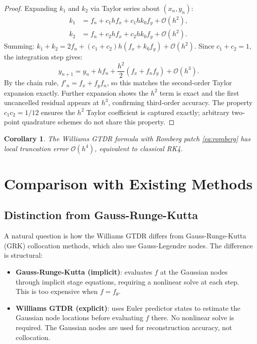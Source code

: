 \documentclass[conference]{IEEEtran}
\newtheorem{corollary}{Corollary}
\begin{document}
\begin{proof}
Expanding $k_1$ and $k_2$ via Taylor series about $(x_n, y_n)$:
\begin{align}
    k_1 &= f_n + c_1 h f_x + c_1 h k_0 f_y + \mathcal{O}(h^2), \\
    k_2 &= f_n + c_2 h f_x + c_2 h k_0 f_y + \mathcal{O}(h^2).
\end{align}
Summing: $k_1 + k_2 = 2f_n + (c_1 + c_2)h(f_x + k_0 f_y) +
\mathcal{O}(h^2)$. Since $c_1 + c_2 = 1$, the integration step gives:
\begin{equation}
    y_{n+1} = y_n + h f_n + \frac{h^2}{2}(f_x + f_n f_y) + \mathcal{O}(h^3).
\end{equation}
By the chain rule, $f'_n = f_x + f_y f_n$, so this matches the
second-order Taylor expansion exactly. Further expansion shows the $h^2$
term is exact and the first uncancelled residual appears at $h^3$,
confirming third-order accuracy. The property $c_1 c_2 = 1/12$ ensures
the $h^2$ Taylor coefficient is captured exactly; arbitrary two-point
quadrature schemes do not share this property.
\end{proof}

\begin{corollary}
The Williams GTDR formula with Romberg patch \eqref{eq:romberg} has
local truncation error $\mathcal{O}(h^4)$, equivalent to classical RK4.
\end{corollary}

\section{Comparison with Existing Methods}
\label{sec:comparison}

\subsection{Distinction from Gauss-Runge-Kutta}

A natural question is how the Williams GTDR differs from Gauss-Runge-Kutta
(GRK) collocation methods, which also use Gauss-Legendre nodes. The
difference is structural:

\begin{itemize}
    \item \textbf{Gauss-Runge-Kutta (implicit)}: evaluates $f$ at the
    Gaussian nodes through implicit stage equations, requiring a nonlinear
    solve at each step. This is too expensive when $f = f_\theta$.
    \item \textbf{Williams GTDR (explicit)}: uses Euler predictor states
    to estimate the Gaussian node locations before evaluating $f$ there.
    No nonlinear solve is required. The Gaussian nodes are used for
    reconstruction accuracy, not collocation.
\end{itemize}
\end{document}

